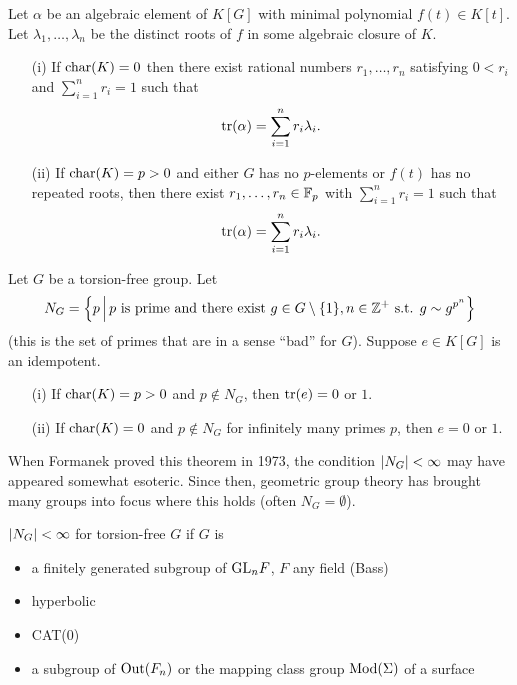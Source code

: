 \begin{theorem}
    Let $\alpha$ be an algebraic element of $K[G]$ with minimal polynomial $f(t) \in K[t]$.
    Let $\lambda_1, \dots, \lambda_n$ be the distinct roots of $f$ in some algebraic closure of $K$.
    \begin{enumerate}
        \item[(i)] If $\mathrm{char}(K) = 0$ then there exist rational numbers $r_1, \dots, r_n$ satisfying $0 < r_i$ and $\sum_{i=1}^n r_i = 1$ such that \[
            \operatorname{tr}(\alpha) = \sum_{i=1}^n r_i \lambda_i.
        \]
        \item[(ii)] If $\mathrm{char}(K) = p > 0$ and either $G$ has no $p$-elements or $f(t)$ has no repeated roots, then there exist $r_1, \dots, r_n \in \mathbb{F}_p$ with $\sum_{i=1}^n r_i = 1$ such that \[
            \operatorname{tr}(\alpha) = \sum_{i=1}^n r_i \lambda_i.
        \]
    \end{enumerate}
\end{theorem}

\begin{theorem}[Formanek]
    \label{theorem:formanek}
    Let $G$ be a torsion-free group.
    Let \[
        N_G = \left\{ p \,\middle|\, p \text{ is prime and there exist } g \in G \setminus \{1\}, n \in \mathbb{Z}^+ \text{ s.t. } g \sim g^{p^n} \right\}
    \] (this is the set of primes that are in a sense ``bad'' for $G$).
    Suppose $e \in K[G]$ is an idempotent.
    \begin{enumerate}
        \item[(i)] If $\mathrm{char}(K) = p > 0$ and $p \notin N_G$, then $\operatorname{tr}(e) = 0$ or $1$.
        \item[(ii)] If $\mathrm{char}(K) = 0$ and $p \notin N_G$ for infinitely many primes $p$, then $e = 0$ or $1$.
    \end{enumerate}
\end{theorem}

\begin{remark}
    When Formanek proved this theorem in 1973, the condition $\lvert N_G \rvert < \infty$ may have appeared somewhat esoteric.
    Since then, geometric group theory has brought many groups into focus where this holds (often $N_G = \emptyset$).
\end{remark}

\begin{example}
    $\lvert N_G \rvert < \infty$ for torsion-free $G$ if $G$ is
    \begin{itemize}
        \item a finitely generated subgroup of $\mathrm{GL}_n F$, $F$ any field (Bass)
        \item hyperbolic
        \item CAT(0)
        \item a subgroup of $\mathrm{Out}(F_n)$ or the mapping class group $\mathrm{Mod}(\Sigma)$ of a surface
    \end{itemize}
\end{example}

